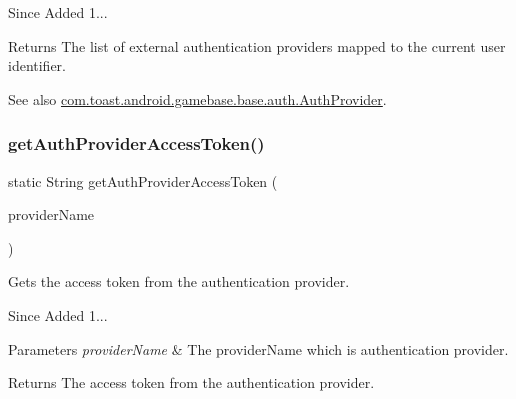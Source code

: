 \begin{DoxySince}{Since}
Added 1... 
\end{DoxySince}
\begin{DoxyReturn}{Returns}
The list of external authentication providers mapped to the current user identifier. 
\end{DoxyReturn}
\begin{DoxySeeAlso}{See also}
\hyperlink{interfacecom_1_1toast_1_1android_1_1gamebase_1_1base_1_1auth_1_1_auth_provider}{com.\+toast.\+android.\+gamebase.\+base.\+auth.\+Auth\+Provider}. 
\end{DoxySeeAlso}
\mbox{\label{classcom_1_1toast_1_1android_1_1gamebase_1_1_gamebase_ae2f90bca5deb4d7dff72b890a257814f}} 
\subsubsection{\texorpdfstring{get\+Auth\+Provider\+Access\+Token()}{getAuthProviderAccessToken()}}
{\footnotesize\ttfamily static String get\+Auth\+Provider\+Access\+Token (\begin{DoxyParamCaption}\item[{@Non\+Null String}]{provider\+Name }\end{DoxyParamCaption})\hspace{0.3cm}{\ttfamily [static]}}



Gets the access token from the authentication provider. 

\begin{DoxySince}{Since}
Added 1... 
\end{DoxySince}

\begin{DoxyParams}{Parameters}
{\em provider\+Name} & The provider\+Name which is authentication provider. \\
\hline
\end{DoxyParams}
\begin{DoxyReturn}{Returns}
The access token from the authentication provider. 
\end{DoxyReturn}
\mbox{\label{classcom_1_1toast_1_1android_1_1gamebase_1_1_gamebase_abfa260ed922444ef35f23f8ac847b4f8}} 

